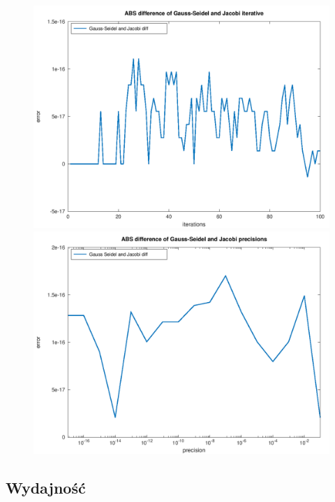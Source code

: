 \documentclass[10pt]{article}
\begin{document}
\begin{figure}[h]
\centering
\includegraphics[scale=0.45]{plots/03_abs_iterative_methods_all_rows.png}
\includegraphics[scale=0.45]{plots/05_abs_precision_methods_all_rows.png}
\end{figure}
\subsection {Wydajność}
\end{document}
